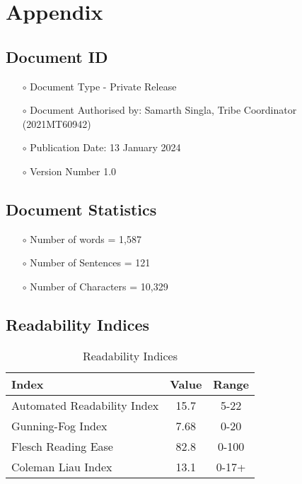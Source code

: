 \section{Appendix}
\subsection{Document ID}
\begin{itemize}
    \item[$\scriptstyle\circ$] Document Type - Private Release
    \item[$\scriptstyle\circ$] Document Authorised by: Samarth Singla, Tribe Coordinator (2021MT60942)
    \item[$\scriptstyle\circ$] Publication Date: 13 January 2024
    \item[$\scriptstyle\circ$] Version Number 1.0
\end{itemize}

\subsection{Document Statistics}
\begin{itemize}
    \item[$\scriptstyle\circ$] Number of words = 1,587
    \item[$\scriptstyle\circ$] Number of Sentences = 121
    \item[$\scriptstyle\circ$] Number of Characters = 10,329
\end{itemize}

\subsection{Readability Indices}
\vspace{\baselineskip}

\begin{table}[h]
\centering
\begin{tabular}{|l|c|c|}
\hline
\textbf{Index}              & \textbf{Value} & \textbf{Range} \\ 
\hline
Automated Readability Index & 15.7            & 5-22       \\ 
\hline
Gunning-Fog Index           & 7.68           & 0-20           \\ 
\hline
Flesch Reading Ease         & 82.8           & 0-100          \\ 
\hline
Coleman Liau Index          & 13.1          & 0-17+          \\ 
\hline
\end{tabular}
\caption{Readability Indices}
\end{table}
